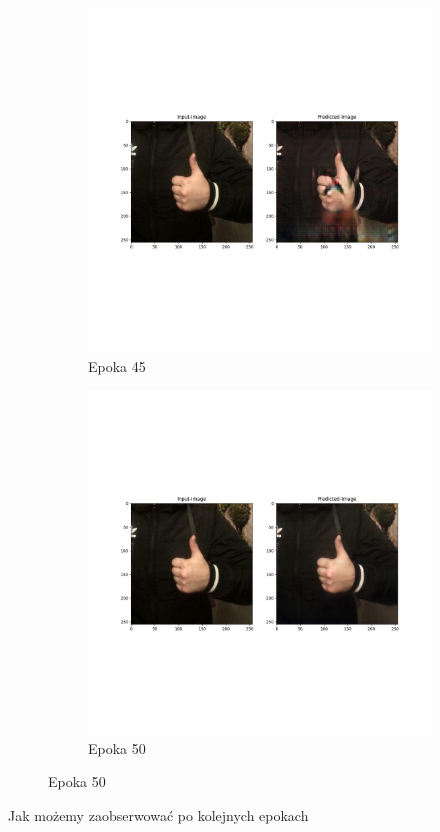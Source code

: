 \documentclass[12pt]{article}
\begin{document}
\begin{sloppypar}
{{\begin{figure}
    \end{figure}
    \begin{figure}
      \begin{subfigure}{.5\textwidth}
        \centering
        \includegraphics[width=.8\linewidth]{cycle-gan/epoch-45.jpg}
        \caption{Epoka 45}
        \label{fig:cg-45}
      \end{subfigure}%
      \begin{subfigure}{.5\textwidth}
        \centering
        \includegraphics[width=.8\linewidth]{cycle-gan/epoch-50.jpg}
        \caption{Epoka 50}
        \label{fig:cg-50}
      \end{subfigure}
    \end{figure}
    Jak możemy zaobserwować po kolejnych epokach
  }
}


\end{sloppypar}
\end{document}
